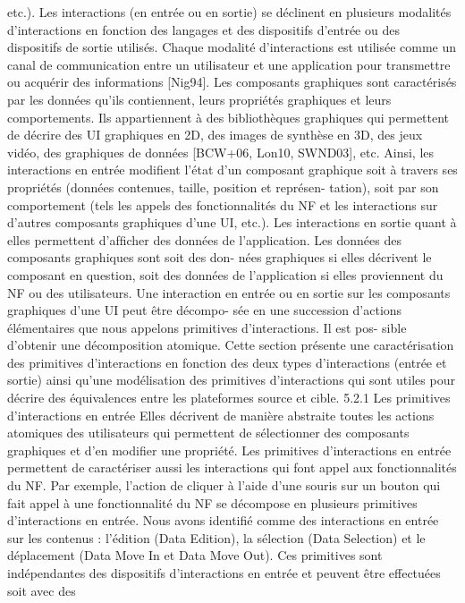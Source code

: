 \documentclass{article}
\begin{document}
etc.). Les interactions (en entrée ou en sortie) se déclinent en plusieurs modalités d’interactions en
fonction des langages et des dispositifs d’entrée ou des dispositifs de sortie utilisés. Chaque modalité
d’interactions est utilisée comme un canal de communication entre un utilisateur et une application
pour transmettre ou acquérir des informations [Nig94].
Les composants graphiques sont caractérisés par les données qu’ils contiennent, leurs propriétés
graphiques et leurs comportements. Ils appartiennent à des bibliothèques graphiques qui permettent
de décrire des UI graphiques en 2D, des images de synthèse en 3D, des jeux vidéo, des graphiques
de données [BCW+06, Lon10, SWND03], etc. Ainsi, les interactions en entrée modiﬁent l’état d’un
composant graphique soit à travers ses propriétés (données contenues, taille, position et représen-
tation), soit par son comportement (tels les appels des fonctionnalités du NF et les interactions sur
d’autres composants graphiques d’une UI, etc.). Les interactions en sortie quant à elles permettent
d’afﬁcher des données de l’application. Les données des composants graphiques sont soit des don-
nées graphiques si elles décrivent le composant en question, soit des données de l’application si
elles proviennent du NF ou des utilisateurs.
Une interaction en entrée ou en sortie sur les composants graphiques d’une UI peut être décompo-
sée en une succession d’actions élémentaires que nous appelons primitives d’interactions. Il est pos-
sible d’obtenir une décomposition atomique. Cette section présente une caractérisation des primitives
d’interactions en fonction des deux types d’interactions (entrée et sortie) ainsi qu’une modélisation
des primitives d’interactions qui sont utiles pour décrire des équivalences entre les plateformes source
et cible.
5.2.1
Les primitives d’interactions en entrée
Elles décrivent de manière abstraite toutes les actions atomiques des utilisateurs qui permettent de
sélectionner des composants graphiques et d’en modiﬁer une propriété. Les primitives d’interactions
en entrée permettent de caractériser aussi les interactions qui font appel aux fonctionnalités du NF.
Par exemple, l’action de cliquer à l’aide d’une souris sur un bouton qui fait appel à une fonctionnalité
du NF se décompose en plusieurs primitives d’interactions en entrée.
Nous avons identiﬁé comme des interactions en entrée sur les contenus : l’édition (Data Edition),
la sélection (Data Selection) et le déplacement (Data Move In et Data Move Out). Ces primitives
sont indépendantes des dispositifs d’interactions en entrée et peuvent être effectuées soit avec des
\end{document}
